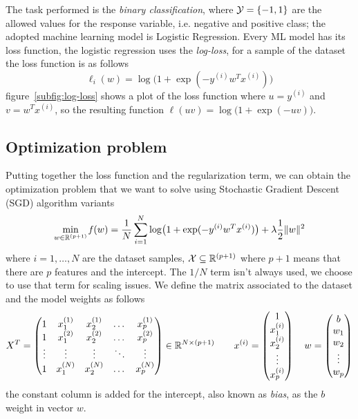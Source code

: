 The task performed is the \emph{binary classification}, where $\mathcal{Y}=\{-1,1\}$ are the allowed values for the response variable, i.e. negative and positive class; the adopted machine learning model is Logistic Regression. Every ML model has its loss function, the logistic regression uses the \emph{log-loss}, for a sample of the dataset the loss function is as follows
\begin{equation}\label{eq:sample_loss}
\ell_i(w)=\log\bigl(1+\exp(-y^{(i)}w^Tx^{(i)})\bigr)
\end{equation}
figure~\vref{subfig:log-loss} shows a plot of the loss function where $u=y^{(i)}$ and $v=w^Tx^{(i)}$, so the resulting function $\ell(uv)=\log\bigl(1+\exp(-uv)\bigr)$.

\subsection{Optimization problem}

Putting together the loss function and the regularization term, we can obtain the optimization problem that we want to solve using Stochastic Gradient Descent (SGD) algorithm variants
\begin{equation}\label{eq:opt-prob}
\min_{w\in\mathbb{R}^{(p+1)}}\operatorname*{\mathit{f}}(w)=\frac{1}{N}\sum_{i=1}^N\log\bigl(1+\exp(-y^{(i)}w^Tx^{(i)})\bigr)+\lambda\frac{1}{2}\lVert w\rVert^2
\end{equation}
where $i=1,\dots,N$ are the dataset samples, $\mathcal{X}\subseteq\mathbb{R}^{(p+1)}$ where $p+1$ means that there are $p$ features and the intercept. The $1/N$ term isn't always used, we choose to use that term for scaling issues. We define the matrix associated to the dataset and the model weights as follows
\[
X^T=
\begin{pmatrix}
1 & x_1^{(1)} & x_2^{(1)} & \dots & x_p^{(1)} \\
1 & x_1^{(2)} & x_2^{(2)} & \dots & x_p^{(2)} \\
\vdots & \vdots & \vdots & \ddots & \vdots \\
1 & x_1^{(N)} & x_2^{(N)} & \dots & x_p^{(N)}
\end{pmatrix}\in\mathbb{R}^{N\times(p+1)}\qquad
x^{(i)}=
\begin{pmatrix}
1 \\ x_1^{(i)} \\ x_2^{(i)} \\ \vdots \\ x_p^{(i)}
\end{pmatrix}\quad
w=
\begin{pmatrix}
b \\ w_1 \\ w_2 \\ \vdots \\ w_p
\end{pmatrix}
\]
the constant column is added for the intercept, also known as \emph{bias}, as the $b$ weight in vector $w$.%

